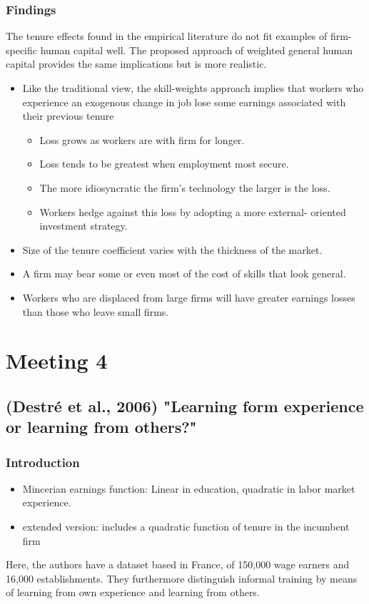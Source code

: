 \documentclass[12pt,a4paper]{article}
\begin{document}
  \subsubsection{Findings}

    The tenure effects found in the empirical literature do not fit examples of firm-specific human capital well. The proposed approach of weighted general human capital provides the same implications but is more realistic.
    \begin{itemize}
      \item Like the traditional view, the skill-weights approach implies that workers who experience an exogenous change in job lose some earnings associated with their previous tenure
        \begin{itemize}
          \item Loss grows as workers are with firm for longer.
          \item Loss tends to be greatest when employment most secure.
          \item The more idiosyncratic the firm's technology the larger is the loss.
          \item Workers hedge against this loss by adopting a more external- oriented investment strategy.
        \end{itemize}
      \item Size of the tenure coefficient varies with the thickness of the market.
      \item A firm may bear some or even most of the cost of skills that look general.
      \item Workers who are displaced from large firms will have greater earnings losses than those who leave small firms.
    \end{itemize}

  \section{Meeting 4} %
  \label{prt:Meeting 4}
  \subsection{(Destré et al., 2006) "Learning form experience or learning from others?"} %
  \label{sec:Destre2006}
  \setcounter{equation}{0}

  \subsubsection{Introduction} %
  \label{ssub:Introduction}
  \begin{itemize}
    \item Mincerian earnings function: Linear in education, quadratic in labor market experience.
    \item extended version: includes a quadratic function of tenure in the incumbent firm
  \end{itemize}
  Here, the authors have a dataset based in France, of 150,000 wage earners and 16,000
  establishments. They furthermore distinguish informal training by means of learning from own
  experience and learning from others.
\end{document}
